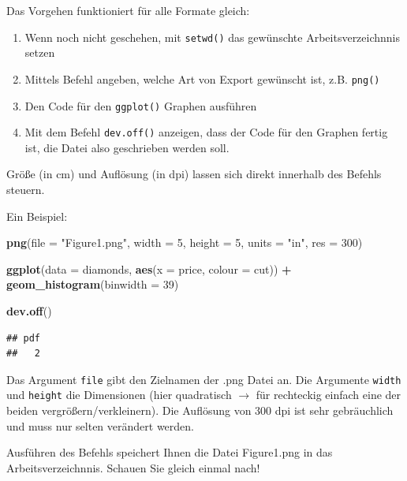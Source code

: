 \documentclass[
]{book}
\newenvironment{Shaded}{\begin{snugshade}}{\end{snugshade}}
\newcommand{\AttributeTok}[1]{\textcolor[rgb]{0.13,0.29,0.53}{#1}}
\newcommand{\DecValTok}[1]{\textcolor[rgb]{0.00,0.00,0.81}{#1}}
\newcommand{\FunctionTok}[1]{\textcolor[rgb]{0.13,0.29,0.53}{\textbf{#1}}}
\newcommand{\NormalTok}[1]{#1}
\newcommand{\SpecialCharTok}[1]{\textcolor[rgb]{0.81,0.36,0.00}{\textbf{#1}}}
\newcommand{\StringTok}[1]{\textcolor[rgb]{0.31,0.60,0.02}{#1}}
\begin{document}
Das Vorgehen funktioniert für alle Formate gleich:

\begin{enumerate}
\def\labelenumi{\arabic{enumi}.}
\item
  Wenn noch nicht geschehen, mit \texttt{setwd()} das gewünschte Arbeitsverzeichnnis setzen
\item
  Mittels Befehl angeben, welche Art von Export gewünscht ist, z.B. \texttt{png()}
\item
  Den Code für den \texttt{ggplot()} Graphen ausführen
\item
  Mit dem Befehl \texttt{dev.off()} anzeigen, dass der Code für den Graphen fertig ist, die Datei also geschrieben werden soll.
\end{enumerate}

Größe (in cm) und Auflösung (in dpi) lassen sich direkt innerhalb des Befehls steuern.

Ein Beispiel:

\begin{Shaded}
\begin{Highlighting}[]
\FunctionTok{png}\NormalTok{(}\AttributeTok{file =} \StringTok{"Figure1.png"}\NormalTok{, }\AttributeTok{width =} \DecValTok{5}\NormalTok{, }\AttributeTok{height =} \DecValTok{5}\NormalTok{, }\AttributeTok{units =} \StringTok{"in"}\NormalTok{, }\AttributeTok{res =} \DecValTok{300}\NormalTok{)}

\FunctionTok{ggplot}\NormalTok{(}\AttributeTok{data =}\NormalTok{ diamonds, }\FunctionTok{aes}\NormalTok{(}\AttributeTok{x =}\NormalTok{ price, }\AttributeTok{colour =}\NormalTok{ cut)) }\SpecialCharTok{+}
  \FunctionTok{geom\_histogram}\NormalTok{(}\AttributeTok{binwidth =} \DecValTok{39}\NormalTok{)}

\FunctionTok{dev.off}\NormalTok{()}
\end{Highlighting}
\end{Shaded}

\begin{verbatim}
## pdf 
##   2
\end{verbatim}

Das Argument \texttt{file} gibt den Zielnamen der .png Datei an. Die Argumente \texttt{width} und \texttt{height} die Dimensionen (hier quadratisch \(\rightarrow\) für rechteckig einfach eine der beiden vergrößern/verkleinern). Die Auflösung von 300 dpi ist sehr gebräuchlich und muss nur selten verändert werden.

Ausführen des Befehls speichert Ihnen die Datei Figure1.png in das Arbeitsverzeichnnis. Schauen Sie gleich einmal nach!
\end{document}
